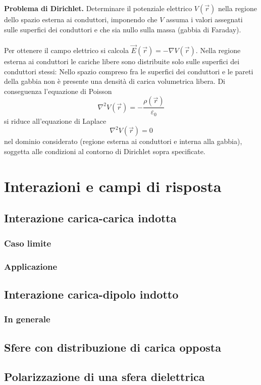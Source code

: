 \documentclass{book}
\begin{document}
\noindent\textbf{Problema di Dirichlet.} Determinare il potenziale elettrico \(V(\vec r)\) nella regione dello spazio esterna ai conduttori, imponendo che \(V\) assuma i valori assegnati sulle superfici dei conduttori e che sia nullo sulla massa (gabbia di Faraday).
\\
\\
Per ottenere il campo elettrico si calcola \(\vec{E}(\vec r)=-\nabla V(\vec r)\). Nella regione esterna ai conduttori le cariche libere sono distribuite solo sulle superfici dei conduttori stessi: Nello spazio compreso fra le superfici dei conduttori e le pareti della gabbia non è presente una densità di carica volumetrica libera. Di conseguenza l'equazione di Poisson
\[
\nabla^2 V(\vec r) = -\frac{\rho(\vec r)}{\varepsilon_0}
\]
si riduce all'equazione di Laplace
\[
\nabla^2 V(\vec r)=0
\]
nel dominio considerato (regione esterna ai conduttori e interna alla gabbia), soggetta alle condizioni al contorno di Dirichlet sopra specificate.


\chapter{Interazioni e campi di risposta}
\section{Interazione carica-carica indotta}
\subsection{Caso limite}
\subsection{Applicazione}
\section{Interazione carica-dipolo indotto}
\subsection{In generale}
\section{Sfere con distribuzione di carica opposta}
\section{Polarizzazione di una sfera dielettrica}
\end{document}
